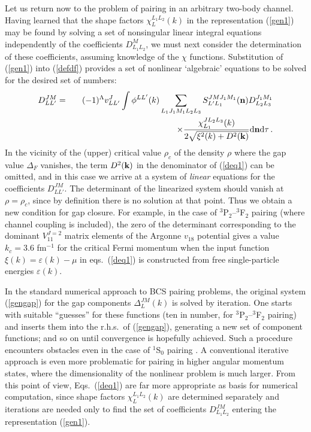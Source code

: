 Let us return now to the problem of pairing in an arbitrary two-body
channel.  Having learned that the shape factors $\chi_L^{L_1L_2}(k)$ 
in the representation (\ref{gen1}) may be found by solving a set of 
nonsingular linear integral equations independently of the 
coefficients $D_{L_1L_2}^M$, we must next consider the determination 
of these coefficients, assuming knowledge of the $\chi$ functions.  
Substitution of (\ref{gen1}) into (\ref{defdf}) provides a set 
of nonlinear `algebraic' equations to be solved for the desired 
set of numbers:
\begin{eqnarray}
D^{JM}_{LL'}&=&(-1)^\Lambda v_{LL'}^J\int\phi^{LL'}(k)\sum_{L_1J_1M_1L_2L_3}
S_{L'L_1}^{JMJ_1M_1}({\bf n})D^{J_1M_1}_{L_2L_3} \nonumber \\
 &\qquad& \qquad \times \frac{\chi^{JL_2L_3}_{L_1}(k)}
{2\sqrt{\xi^2(k) + D^2({\bf k})}}{\rm d} {\bf n} {\rm d} \tau \, .
\label{deq1}
\end{eqnarray}
In the vicinity of the (upper) critical value $\rho_c$ of the density
$\rho$ where the gap value $\Delta_F$ vanishes, the term $D^2({\bf k})$
in the denominator of (\ref{deq1}) can be omitted, and in this case we
arrive at a system of {\it linear} equations for the coefficients
$D^{JM}_{LL'}$. The determinant of the linearized system should vanish at
$\rho=\rho_c$, since by definition there is no solution at that point.
Thus we obtain a new condition for gap closure.  For example, in the
case of $^3$P$_2$--$^3$F$_2$ pairing (where channel coupling is 
included), the zero of the determinant corresponding to the dominant 
$V_{11}^{J=2}$ matrix elements of the Argonne $v_{18}$ potential 
\cite{argonne18} gives a value $k_c = 3.6$ fm$^{-1}$ for the critical 
Fermi momentum when the input function $\xi(k)=\varepsilon(k)-\mu$ 
in eqs.~(\ref{deq1}) is constructed from free single-particle energies 
$\varepsilon(k)$.

In the standard numerical approach to BCS pairing problems, the original
system (\ref{gengap}) for the gap components $\Delta^{JM}_L(k)$
is solved by iteration.  One starts with suitable
``guesses'' for these functions (ten in number, for $^3$P$_2$--$^3$F$_2$
pairing) and inserts them into the r.h.s.\ of (\ref{gengap}), generating
a new set of component functions; and so on until convergence is
hopefully achieved.  Such a procedure encounters obstacles even in
the case of $^1$S$_0$ pairing \cite{kkc,baldo1,ccdk}.  A conventional
iterative approach is even more problematic for pairing in higher angular
momentum states, where the dimensionality of the nonlinear problem is
much larger.  From this point of view, Eqs.~(\ref{deq1}) are far more
appropriate as basis for numerical computation, since shape factors
$\chi_L^{L_1L_2}(k)$ are determined separately and iterations are needed 
only to find the set of coefficients $D^{JM}_{L_1L_2}$ entering the
representation (\ref{gen1}).

